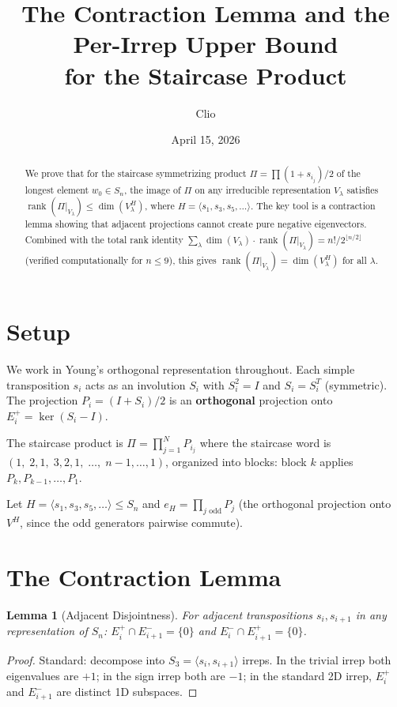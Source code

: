 \documentclass[11pt]{article}
\title{The Contraction Lemma and the Per-Irrep Upper Bound\\
for the Staircase Product}
\author{Clio}
\date{April 15, 2026}
\newtheorem{lemma}[theorem]{Lemma}
\theoremstyle{definition}
\theoremstyle{remark}
\newcommand{\rank}{\operatorname{rank}}
\begin{document}
\maketitle

\begin{abstract}
We prove that for the staircase symmetrizing product
$\Pi = \prod (1+s_{i_j})/2$ of the longest element $w_0 \in S_n$,
the image of $\Pi$ on any irreducible representation $V_\lambda$
satisfies $\rank(\Pi|_{V_\lambda}) \leq \dim(V_\lambda^H)$, where
$H = \langle s_1, s_3, s_5, \ldots \rangle$.
The key tool is a contraction lemma showing that adjacent projections
cannot create pure negative eigenvectors.
Combined with the total rank identity
$\sum_\lambda \dim(V_\lambda) \cdot \rank(\Pi|_{V_\lambda})
= n!/2^{\lfloor n/2 \rfloor}$
(verified computationally for $n \leq 9$),
this gives $\rank(\Pi|_{V_\lambda}) = \dim(V_\lambda^H)$ for all $\lambda$.
\end{abstract}

\section{Setup}

We work in Young's orthogonal representation throughout.
Each simple transposition $s_i$ acts as an involution $S_i$ with $S_i^2 = I$
and $S_i = S_i^T$ (symmetric). The projection $P_i = (I + S_i)/2$ is
an \textbf{orthogonal} projection onto $E_i^+ = \ker(S_i - I)$.

The staircase product is $\Pi = \prod_{j=1}^{N} P_{i_j}$ where the
staircase word is $(1, \; 2,1, \; 3,2,1, \; \ldots, \; n{-}1, \ldots, 1)$,
organized into blocks: block $k$ applies $P_k, P_{k-1}, \ldots, P_1$.

Let $H = \langle s_1, s_3, s_5, \ldots \rangle \leq S_n$ and
$e_H = \prod_{j \text{ odd}} P_j$ (the orthogonal projection onto $V^H$,
since the odd generators pairwise commute).

\section{The Contraction Lemma}

\begin{lemma}[Adjacent Disjointness]\label{lem:adj}
For adjacent transpositions $s_i, s_{i+1}$ in any representation of $S_n$:
$E_i^+ \cap E_{i+1}^- = \{0\}$ and $E_i^- \cap E_{i+1}^+ = \{0\}$.
\end{lemma}

\begin{proof}
Standard: decompose into $S_3 = \langle s_i, s_{i+1} \rangle$ irreps.
In the trivial irrep both eigenvalues are $+1$; in the sign irrep both are $-1$;
in the standard 2D irrep, $E_i^+$ and $E_{i+1}^-$ are distinct 1D subspaces.
\end{proof}
\end{document}
